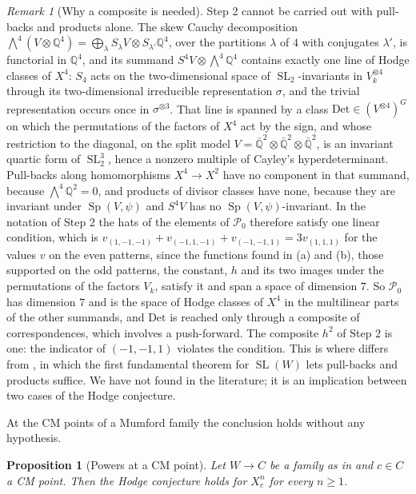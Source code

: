 \documentclass[11pt,reqno]{amsart}
\theoremstyle{plain}
\newtheorem{proposition}[theorem]{Proposition}
\theoremstyle{definition}
\theoremstyle{remark}
\newtheorem{remark}[theorem]{Remark}
\newcommand{\QQ}{\mathbb{Q}}
\newcommand{\cP}{\mathcal{P}}
\DeclareMathOperator{\SL}{SL}
\DeclareMathOperator{\Sp}{Sp}
\begin{document}
\begin{remark}[Why a composite is needed]\label{rem:mumforddet}
Step 2 cannot be carried out with pull-backs and products alone. The skew
Cauchy decomposition $\bigwedge^{4}(V\otimes\QQ^{4})=\bigoplus_{\lambda}
S_{\lambda}V\otimes S_{\lambda'}\QQ^{4}$, over the partitions $\lambda$ of $4$
with conjugates $\lambda'$, is functorial in $\QQ^{4}$, and its summand
$S^{4}V\otimes\bigwedge^{4}\QQ^{4}$ contains exactly one line of Hodge classes
of $X^{4}$: $S_{4}$ acts on the two-dimensional space of $\SL_{2}$-invariants
in $V_{k}^{\otimes4}$ through its two-dimensional irreducible representation
$\sigma$, and the trivial representation occurs once in $\sigma^{\otimes3}$.
That line is spanned by a class $\mathrm{Det}\in(V^{\otimes4})^{G}$ on which
the permutations of the factors of $X^{4}$ act by the sign, and whose
restriction to the diagonal, on the split model
$V=\bar{\QQ}^{2}\otimes\bar{\QQ}^{2}\otimes\bar{\QQ}^{2}$, is an invariant
quartic form of $\SL_{2}^{3}$, hence a nonzero multiple of Cayley's
hyperdeterminant. Pull-backs along homomorphisms
$X^{4}\to X^{2}$ have no component in that summand, because
$\bigwedge^{4}\QQ^{2}=0$, and products of divisor classes have none, because
they are invariant under $\Sp(V,\psi)$ and $S^{4}V$ has no
$\Sp(V,\psi)$-invariant. In the notation of Step 2 the hats of the elements
of $\cP_{0}$ therefore satisfy one linear condition, which is
$v_{(1,-1,-1)}+v_{(-1,1,-1)}+v_{(-1,-1,1)}=3v_{(1,1,1)}$ for the values $v$ on
the even patterns, since the functions found in (a) and (b), those supported
on the odd patterns, the constant, $h$ and its two images under the
permutations of the factors $V_{k}$, satisfy it and
span a space of dimension $7$. So $\cP_{0}$ has dimension $7$ and is the space
of Hodge classes of $X^{4}$ in the multilinear parts of the other summands,
and $\mathrm{Det}$ is reached only through a composite of correspondences,
which involves a push-forward. The composite $h^{2}$ of Step 2 is one: the
indicator of $(-1,-1,1)$ violates the condition. This is where
 differs from , in which the first
fundamental theorem for $\SL(W)$ lets pull-backs and products suffice. We have
not found  in the literature; it is an implication
between two cases of the Hodge conjecture.
\end{remark}

At the CM points of a Mumford family the conclusion holds without any
hypothesis.

\begin{proposition}[Powers at a CM point]\label{prop:mumfordcmpowers}
Let $W\to C$ be a family as in  and $c\in C$ a CM
point. Then the Hodge conjecture holds for $X_{c}^{n}$ for every $n\ge1$.
\end{proposition}
\end{document}
